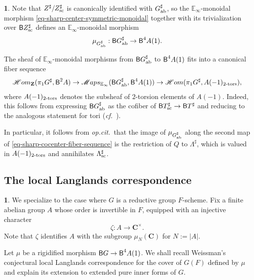 \documentclass[10pt,english,reqno]{amsart}
\newcommand{\integers}{\mathbf Z}
\newcommand{\complexes}{\mathbf C}
\newcommand{\SMaps}{\mathscr{M}aps}
\newcommand{\SHom}{\mathscr{H}om}
\newcommand{\deloop}{\textnormal{\textsf{B}}}
\newcommand{\sconn}{\textnormal{sc}}
\newcommand{\abelian}{\textnormal{ab}}
\newcommand{\tors}{\textnormal{-tors}}
\theoremstyle{definition}
\numberwithin{equation}{section}
\newtheorem{untitledsubsubsection}[subsubsection]{}
\newenvironment{void}
{\begin{untitledsubsubsection}}
{\end{untitledsubsubsection}}
\begin{document}

\begin{void}
\label{void-sharp-cocenter-induced-cover}
Note that $Z^{\sharp}/Z^{\sharp}_{\sconn}$ is canonically identified with $G^{\sharp}_{\abelian}$, so the $\mathbb E_{\infty}$-monoidal morphism \eqref{eq-sharp-center-symmetric-monoidal} together with its trivialization over $\deloop Z^{\sharp}_{\sconn}$ defines an $\mathbb E_{\infty}$-monoidal morphism
\begin{equation}
\label{eq-sharp-cocenter-induced-cover}
\mu_{G^{\sharp}_{\abelian}} : \deloop G^{\sharp}_{\abelian} \rightarrow \deloop^4A(1).
\end{equation}

The sheaf of $\mathbb E_{\infty}$-monoidal morphisms from $\deloop G^{\sharp}_{\abelian}$ to $\deloop^4A(1)$ fits into a canonical fiber sequence
\begin{equation}
\label{eq-sharp-cocenter-fiber-sequence}
\SHom_{\integers}(\pi_1G^{\sharp}, \deloop^2A) \rightarrow \SMaps_{\mathbb E_{\infty}}(\deloop G^{\sharp}_{\abelian}, \deloop^4A(1)) \rightarrow \SHom(\pi_1G^{\sharp}, A(-1)_{2\tors}),
\end{equation}
where $A(-1)_{2\tors}$ denotes the subsheaf of $2$-torsion elements of $A(-1)$. Indeed, this follows from expressing $\deloop G^{\sharp}_{\abelian}$ as the cofiber of $\deloop T_{\sconn}^{\sharp} \rightarrow \deloop T^{\sharp}$ and reducing to the analogous statement for tori (\emph{cf.}~\cite[Proposition 4.6.2]{zhao2022metaplectic}).

In particular, it follows from \emph{op.cit.}~that the image of $\mu_{G_{\abelian}^{\sharp}}$ along the second map of \eqref{eq-sharp-cocenter-fiber-sequence} is the restriction of $Q$ to $\Lambda^{\sharp}$, which is valued in $A(-1)_{2\tors}$ and annihilates $\Lambda^{\sharp}_{\sconn}$.
\end{void}



\subsection{The local Langlands correspondence}
\label{sec-local-langlands-correspondence}

\begin{void}
\label{void-local-langlands-correspondence-context}
We specialize to the case where $G$ is a reductive group $F$-scheme. Fix a finite abelian group $A$ whose order is invertible in $F$, equipped with an injective character
$$
\zeta : A \rightarrow \complexes^{\times}.
$$
Note that $\zeta$ identifies $A$ with the subgroup $\mu_N(\complexes)$ for $N := |A|$.

Let $\mu$ be a rigidified morphism $\deloop G \rightarrow \deloop^4A(1)$. We shall recall Weissman's conjectural local Langlands correspondence for the cover of $G(F)$ defined by $\mu$ and explain its extension to extended pure inner forms of $G$.
\end{void}
\end{document}
